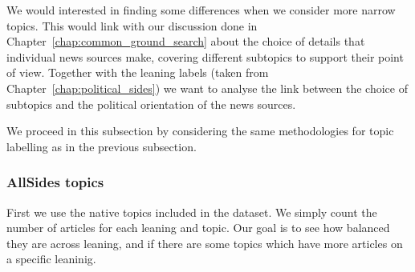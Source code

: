 We would interested in finding some differences when we consider more narrow topics. This would link with our discussion done in Chapter~\ref{chap:common_ground_search} about the choice of details that individual news sources make, covering different subtopics to support their point of view.
Together with the leaning labels (taken from Chapter~\ref{chap:political_sides}) we want to analyse the link between the choice of subtopics and the political orientation of the news sources.




We proceed in this subsection by considering the same methodologies for topic labelling as in the previous subsection.

\subsubsection{\statusgreen AllSides topics}

First we use the native topics included in the dataset. We simply count the number of articles for each leaning and topic. Our goal is to see how balanced they are across leaning, and if there are some topics which have more articles on a specific leaninig.

